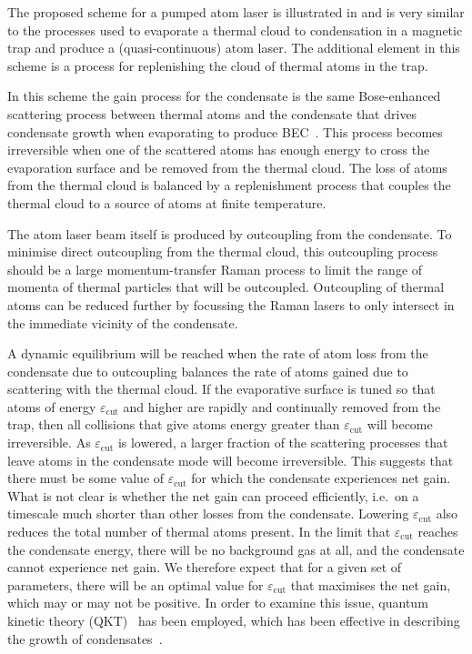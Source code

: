 The proposed scheme for a pumped atom laser is illustrated in  and is very similar to the processes used to evaporate a thermal cloud to condensation in a magnetic trap and produce a (quasi-continuous) atom laser. The additional element in this scheme is a process for replenishing the cloud of thermal atoms in the trap.  

In this scheme the gain process for the condensate is the same Bose-enhanced scattering process between thermal atoms and the condensate that drives condensate growth when evaporating to produce BEC~\citep{Gardiner:1997kx,Davis:2000vn,Bijlsma:2000}.  This process becomes irreversible when one of the scattered atoms has enough energy to cross the evaporation surface and be removed from the thermal cloud.  The loss of atoms from the thermal cloud is balanced by a replenishment process that couples the thermal cloud to a source of atoms at finite temperature.

The atom laser beam itself is produced by outcoupling from the condensate.  To minimise direct outcoupling from the thermal cloud, this outcoupling process should be a large momentum-transfer Raman process to limit the range of momenta of thermal particles that will be outcoupled.  Outcoupling of thermal atoms can be reduced further by focussing the Raman lasers to only intersect in the immediate vicinity of the condensate.

A dynamic equilibrium will be reached when the rate of atom loss from the condensate due to outcoupling balances the rate of atoms gained due to scattering with the thermal cloud.  If the evaporative surface is tuned so that atoms of energy $\varepsilon_\text{cut}$ and higher are rapidly and continually removed from the trap, then all collisions that give atoms energy greater than $\varepsilon_\text{cut}$ will become irreversible. As $\varepsilon_\text{cut}$ is lowered, a larger fraction of the scattering processes that leave atoms in the condensate mode will become irreversible. This suggests that there must be some value of $\varepsilon_\text{cut}$ for which the condensate experiences net gain. What is not clear is whether the net gain can proceed efficiently, i.e.\ on a timescale much shorter than other losses from the condensate.  Lowering $\varepsilon_\text{cut}$ also reduces the total number of thermal atoms present. In the limit that $\varepsilon_\text{cut}$ reaches the condensate energy, there will be no background gas at all, and the condensate cannot experience net gain.  We therefore expect that for a given set of parameters, there will be an optimal value for $\varepsilon_\text{cut}$ that maximises the net gain, which may or may not be positive. In order to examine this issue, quantum kinetic theory (QKT)~\citep{Gardiner:1997tz,Jaksch:1997ug,Gardiner:1998wx,Jaksch:1998sj,Gardiner:2000ug,Lee:2000vs,Davis:2000vn} has been employed, which has been effective in describing the growth of condensates~\citep{Davis:2000vn}.


